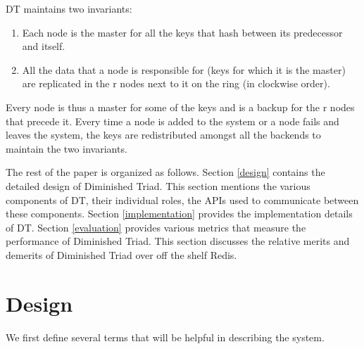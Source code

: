 \documentclass[10pt,twocolumn,letterpaper]{article}
\begin{document}
DT maintains two invariants:
\begin{enumerate}
  \item Each node is the master for all the keys that hash between its predecessor and itself.
  \item All the data that a node is responsible for (keys for which it is the master) are replicated in the r nodes next to it on the ring (in clockwise order).
\end{enumerate}
Every node is thus a master for some of the keys and is a backup for the r nodes that precede it. Every time a node is added to the system or a node fails and leaves the system, the keys are redistributed amongst all the backends to maintain the two invariants.

The rest of the paper is organized as follows. Section \ref{design} contains the detailed design of Diminished Triad. This section mentions the various components of DT, their individual roles, the APIs used to communicate between these components. Section \ref{implementation} provides the implementation details of DT. Section \ref{evaluation} provides various metrics that measure the performance of Diminished Triad. This section discusses the relative merits and demerits of Diminished Triad over off the shelf Redis.


\section{Design} \label{Design}
We first define several terms that will be helpful in describing the system. 
\end{document}
